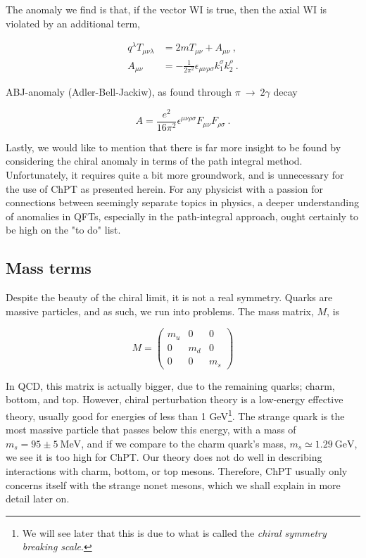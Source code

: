 \documentclass[10pt,twoside]{report}
\begin{document}
	The anomaly we find is that, if the vector WI is true, then the axial WI is violated by an additional term,
	
	\begin{align}
		q^\lambda T_{\mu\nu\lambda} &= 2mT_{\mu\nu} + A_{\mu\nu} \:, \\
		A_{\mu\nu} &= -\frac{1}{2\pi^2}\epsilon_{\mu\nu\rho\sigma}k_1^\sigma k_2^\rho \:.
	\end{align}
	
	ABJ-anomaly (Adler-Bell-Jackiw), as found through $\pi\:\rightarrow\:2\gamma$ decay
	
	\begin{equation}
	A = \frac{e^2}{16\pi^2}\epsilon^{\mu\nu\rho\sigma}F_{\mu\nu}F_{\rho\sigma} \:.
	\end{equation}
	
	Lastly, we would like to mention that there is far more insight to be found by considering the chiral anomaly in terms of the path integral method. Unfortunately, it requires quite a bit more groundwork, and is unnecessary for the use of ChPT as presented herein. For any physicist with a passion for connections between seemingly separate topics in physics, a deeper understanding of anomalies in QFTs, especially in the path-integral approach, ought certainly to be high on the "to do" list.
	
	\subsection{Mass terms}
	Despite the beauty of the chiral limit, it is not a real symmetry. Quarks are massive particles, and as such, we run into problems. The mass matrix, $M$, is
	
	\begin{equation}
	M = \begin{pmatrix}
	m_u & 0 & 0\\
	0 & m_d & 0\\
	0 & 0 & m_s
	\end{pmatrix}
	\end{equation}
	
	In QCD, this matrix is actually bigger, due to the remaining quarks; charm, bottom, and top. However, chiral perturbation theory is a low-energy effective theory, usually good for energies of less than 1 GeV\footnote{We will see later that this is due to what is called the \emph{chiral symmetry breaking scale}.}. The strange quark is the most massive particle that passes below this energy, with a mass of $m_s=95\pm5\:\text{MeV}$, and if we compare to the charm quark's mass, $m_s\simeq1.29\:\text{GeV}$, we see it is too high for ChPT. Our theory does not do well in describing interactions with charm, bottom, or top mesons. Therefore, ChPT usually only concerns itself with the strange nonet mesons, which we shall explain in more detail later on.
	
\end{document}
